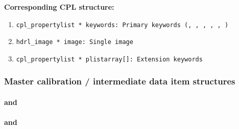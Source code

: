 \begin{datastructdef}
\textbf{Corresponding \ac{CPL} structure:}
\begin{enumerate}
    \item \texttt{cpl\_propertylist * keywords: Primary keywords (\hyperref[fits:dpr.catg]{},  \hyperref[fits:dpr.tech]{},  \hyperref[fits:dpr.type]{},  \hyperref[fits:ins.opti3.name]{},  \hyperref[fits:ins.opti9.name]{},  \hyperref[fits:ins.opti10.name]{})}
    \item \texttt{hdrl\_image * image: Single image}
    \item \texttt{cpl\_propertylist * plistarray[]: Extension keywords}
\end{enumerate}
\end{datastructdef}



\subsubsection{Master calibration / intermediate data item structures}\label{sssec:imgprocdatastructs}
\paragraph{\hyperref[dataitem:masterdark2rg]{} and \hyperref[dataitem:masterdarkgeo]{}}\label{dataitem:masterdark}\label{dataitem:masterdark2rg}\label{dataitem:masterdarkgeo}
\paragraph{\hyperref[dataitem:badpixmap2rg]{} and \hyperref[dataitem:badpixmapgeo]{}}\label{dataitem:badpixmap}\label{dataitem:badpixmap2rg}\label{dataitem:badpixmapgeo}


